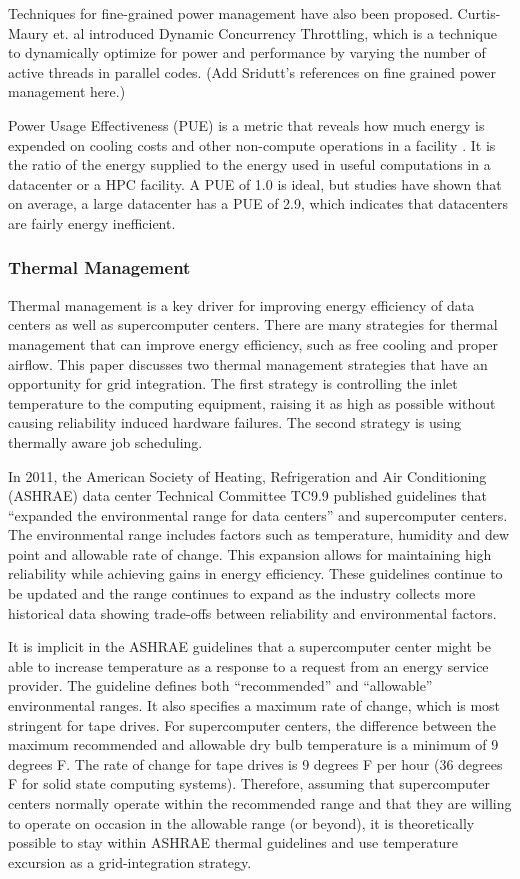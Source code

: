 Techniques for fine-grained power management have also been proposed. Curtis-Maury et. al \cite{Curtis1,Curtis2,Curtis3} introduced Dynamic Concurrency Throttling, which is a technique to dynamically optimize for power and performance by varying the number of active threads in parallel codes. (Add Sridutt's references on fine grained power management here.)

Power Usage Effectiveness (PUE) is a metric that reveals how much energy is expended on cooling costs and other non-compute operations in a facility \cite{Niccolai}. It is the ratio of the energy supplied to the energy used in useful computations in a datacenter or a HPC facility. A PUE of 1.0 is ideal, but studies have shown that on average, a large datacenter has a PUE of 2.9, which indicates that datacenters are fairly energy inefficient. 

\subsubsection{Thermal Management}

Thermal management is a key driver for improving energy efficiency of data centers as well as supercomputer centers.  
There are many strategies for thermal management that can improve energy efficiency, such as free cooling and proper 
airflow.  This paper discusses two thermal management strategies that have an opportunity for grid integration.  
The first strategy is controlling the inlet temperature to the computing equipment, raising it as high as possible 
without causing reliability induced hardware failures.  The second strategy is using thermally aware job scheduling.

In 2011, the American Society of Heating, Refrigeration and Air Conditioning (ASHRAE) data center Technical 
Committee TC9.9 published guidelines that  “expanded the environmental range for data centers” and supercomputer 
centers. The environmental range includes factors such as temperature, humidity and dew point and allowable rate 
of change.  This expansion allows for maintaining high reliability while achieving gains in energy efficiency.  
These guidelines continue to be updated and the range continues to expand as the industry collects more historical 
data showing trade-offs between reliability and environmental factors.

It is implicit in the ASHRAE guidelines that a supercomputer center might be able to increase temperature as a 
response to a request from an energy service provider.  The guideline defines both “recommended” and “allowable” 
environmental ranges.  It also specifies a maximum rate of change, which is most stringent for tape drives. 
For supercomputer centers, the difference between the maximum recommended and allowable dry bulb temperature 
is a minimum of 9 degrees F.  The rate of change for tape drives is 9 degrees F per hour (36 degrees F for solid 
state computing systems).   Therefore, assuming that supercomputer centers normally operate within the recommended 
range and that they are willing to operate on occasion in the allowable range (or beyond), it is theoretically 
possible to stay within ASHRAE thermal guidelines and use temperature excursion as a grid-integration strategy.  

